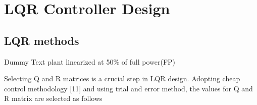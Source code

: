 \chapter{LQR Controller Design}

\section{LQR methods}

Dummy Text
plant linearized at 50\% of full power(FP) \cite{Panwar}

Selecting Q and R matrices is a crucial step in LQR
design. Adopting cheap control methodology [11] and using
trial and error method, the values for Q and R matrix are
selected as follows
